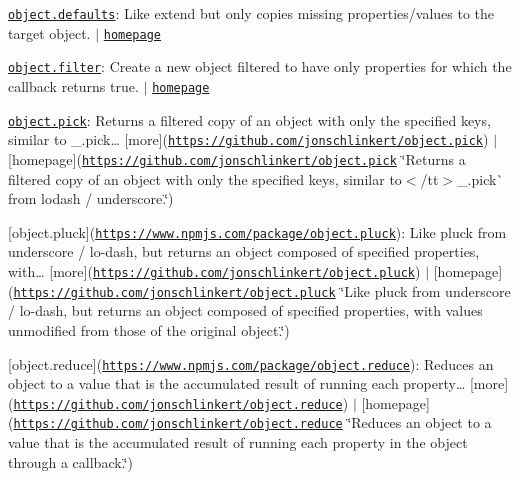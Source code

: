 \begin{DoxyItemize}
\item \href{https://www.npmjs.com/package/object.defaults}{\tt object.\+defaults}\+: Like {\ttfamily extend} but only copies missing properties/values to the target object. $\vert$ \href{https://github.com/jonschlinkert/object.defaults}{\tt homepage}
\item \href{https://www.npmjs.com/package/object.filter}{\tt object.\+filter}\+: Create a new object filtered to have only properties for which the callback returns true. $\vert$ \href{https://github.com/jonschlinkert/object.filter}{\tt homepage}
\item \href{https://www.npmjs.com/package/object.pick}{\tt object.\+pick}\+: Returns a filtered copy of an object with only the specified keys, similar to {\ttfamily \+\_\+.\+pick… \mbox{[}more\mbox{]}(\href{https://github.com/jonschlinkert/object.pick}{\tt https\+://github.\+com/jonschlinkert/object.\+pick}) $\vert$ \mbox{[}homepage\mbox{]}(\href{https://github.com/jonschlinkert/object.pick}{\tt https\+://github.\+com/jonschlinkert/object.\+pick} \char`\"{}\+Returns a filtered copy of an object with only the specified keys, similar to$<$/tt$>$\+\_\+.\+pick\`{} from lodash / underscore.\char`\"{})}
\item {\ttfamily \mbox{[}object.\+pluck\mbox{]}(\href{https://www.npmjs.com/package/object.pluck}{\tt https\+://www.\+npmjs.\+com/package/object.\+pluck})\+: Like pluck from underscore / lo-\/dash, but returns an object composed of specified properties, with… \mbox{[}more\mbox{]}(\href{https://github.com/jonschlinkert/object.pluck}{\tt https\+://github.\+com/jonschlinkert/object.\+pluck}) $\vert$ \mbox{[}homepage\mbox{]}(\href{https://github.com/jonschlinkert/object.pluck}{\tt https\+://github.\+com/jonschlinkert/object.\+pluck} \char`\"{}\+Like pluck from underscore / lo-\/dash, but returns an object composed of specified properties, with values unmodified from those of the original object.\char`\"{})}
\item {\ttfamily \mbox{[}object.\+reduce\mbox{]}(\href{https://www.npmjs.com/package/object.reduce}{\tt https\+://www.\+npmjs.\+com/package/object.\+reduce})\+: Reduces an object to a value that is the accumulated result of running each property… \mbox{[}more\mbox{]}(\href{https://github.com/jonschlinkert/object.reduce}{\tt https\+://github.\+com/jonschlinkert/object.\+reduce}) $\vert$ \mbox{[}homepage\mbox{]}(\href{https://github.com/jonschlinkert/object.reduce}{\tt https\+://github.\+com/jonschlinkert/object.\+reduce} \char`\"{}\+Reduces an object to a value that is the accumulated result of running each property in the object through a callback.\char`\"{})}
\end{DoxyItemize}

